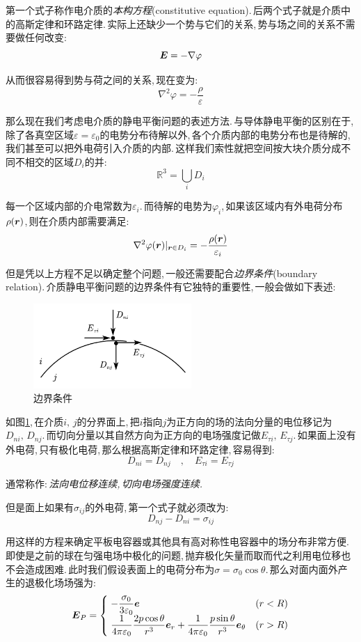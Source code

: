 第一个式子称作电介质的\emph{本构方程}(constitutive equation).\,后两个式子就是介质中的高斯定律和环路定律.\,实际上还缺少一个势与它们的关系,\,势与场之间的关系不需要做任何改变:
\[\boldsymbol{E}=-\nabla \varphi\]

从而很容易得到势与荷之间的关系,\,现在变为:
\[\nabla^2\varphi=-\frac{\rho}{\varepsilon}\]

那么现在我们考虑电介质的静电平衡问题的表述方法.\,与导体静电平衡的区别在于,\,除了各真空区域$\varepsilon=\varepsilon_0$的电势分布待解以外,\,各个介质内部的电势分布也是待解的,\,我们甚至可以把外电荷引入介质的内部.\,这样我们索性就把空间按大块介质分成不同不相交的区域$D_i$的并:
\[\mathbb{R}^3=\bigcup_i D_i\]

每一个区域内部的介电常数为$\varepsilon_i$.\,而待解的电势为$\varphi_i$,\,如果该区域内有外电荷分布$\rho(\boldsymbol{r})$,\,则在介质内部需要满足:
\[\nabla^2\varphi(\boldsymbol{r})|_{\boldsymbol{r}\in D_i}=-\frac{\rho(\boldsymbol{r})}{\varepsilon_i}\]

但是凭以上方程不足以确定整个问题,\,一般还需要配合\emph{边界条件}(boundary relation).\,介质静电平衡问题的边界条件有它独特的重要性,\,一般会做如下表述:

\begin{figure}
\vspace{-0.9cm}
\centering
\includegraphics[width=6cm]{image/7-2-14.png}
\caption{边界条件}\label{fig7-2-14}
\end{figure}
如图\ref{fig7-2-14},\,在介质$i,\,j$的分界面上,\,把$i$指向$j$为正方向的场的法向分量的电位移记为$D_{ni},\,D_{nj}$.\,而切向分量以其自然方向为正方向的电场强度记做$E_{\tau i},\,E_{\tau j}$.\,如果面上没有外电荷,\,只有极化电荷,\,那么根据高斯定律和环路定律,\,容易得到:
\[D_{ni}=D_{nj}\quad ,\quad E_{\tau i}=E_{\tau j}\]

通常称作:\,\emph{法向电位移连续,\,切向电场强度连续.}

但是面上如果有$\sigma_{ij}$的外电荷,\,第一个式子就必须改为:
\[D_{nj}-D_{ni}=\sigma_{ij}\]

用这样的方程来确定平板电容器或其他具有高对称性电容器中的场分布非常方便.\,即使是之前的球在匀强电场中极化的问题,\,抛弃极化矢量而取而代之利用电位移也不会造成困难.\,此时我们假设表面上的电荷分布为$\sigma=\sigma_0 \cos\theta$.\,那么对面内面外产生的退极化场场强为:
\[\boldsymbol{E}_P=\begin{cases}\displaystyle\;-\frac{\sigma_0	}{3\varepsilon_0} \boldsymbol{e}&(r<R)\\\displaystyle \; \frac{1}{4\pi\varepsilon_0} \frac{2p\cos\theta }{r^3}\boldsymbol{e}_r+\frac{1}{4\pi\varepsilon_0} \frac{p\sin\theta }{r^3}\boldsymbol{e}_\theta&(r>R)\end{cases}\]

